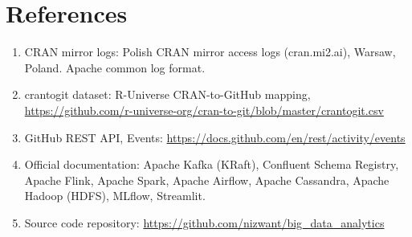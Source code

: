 \documentclass[11pt,a4paper]{article}
\begin{document}
\section{References}
\begin{enumerate}
  \item CRAN mirror logs: Polish CRAN mirror access logs (cran.mi2.ai), Warsaw, Poland. Apache common log format.
  \item crantogit dataset: R-Universe CRAN-to-GitHub mapping, \url{https://github.com/r-universe-org/cran-to-git/blob/master/crantogit.csv}
  \item GitHub REST API, Events: \url{https://docs.github.com/en/rest/activity/events}
  \item Official documentation: Apache Kafka (KRaft), Confluent Schema Registry, Apache Flink, Apache Spark, Apache Airflow, Apache Cassandra, Apache Hadoop (HDFS), MLflow, Streamlit.
  \item Source code repository: \url{https://github.com/nizwant/big_data_analytics}
\end{enumerate}
\end{document}
